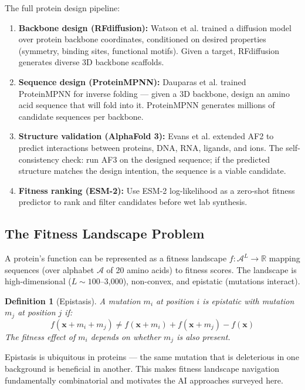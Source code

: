 \documentclass[11pt]{article}
\newtheorem{definition}{Definition}
\begin{document}
The full protein design pipeline:

\begin{enumerate}
\item \textbf{Backbone design (RFdiffusion):} Watson et al. \citep{watson2023novo} trained a diffusion model over protein backbone coordinates, conditioned on desired properties (symmetry, binding sites, functional motifs). Given a target, RFdiffusion generates diverse 3D backbone scaffolds.

\item \textbf{Sequence design (ProteinMPNN):} Dauparas et al. \citep{dauparas2022robust} trained ProteinMPNN for inverse folding --- given a 3D backbone, design an amino acid sequence that will fold into it. ProteinMPNN generates millions of candidate sequences per backbone.

\item \textbf{Structure validation (AlphaFold 3):} Evans et al. \citep{evans2024alphafold3} extended AF2 to predict interactions between proteins, DNA, RNA, ligands, and ions. The self-consistency check: run AF3 on the designed sequence; if the predicted structure matches the design intention, the sequence is a viable candidate.

\item \textbf{Fitness ranking (ESM-2):} Use ESM-2 log-likelihood as a zero-shot fitness predictor to rank and filter candidates before wet lab synthesis.
\end{enumerate}

\subsection{The Fitness Landscape Problem}

A protein's function can be represented as a fitness landscape $f: \mathcal{A}^L \rightarrow \mathbb{R}$ mapping sequences (over alphabet $\mathcal{A}$ of 20 amino acids) to fitness scores. The landscape is high-dimensional ($L \sim 100$--3,000), non-convex, and epistatic (mutations interact).

\begin{definition}[Epistasis]
A mutation $m_i$ at position $i$ is epistatic with mutation $m_j$ at position $j$ if:
$$f(\mathbf{x} + m_i + m_j) \neq f(\mathbf{x} + m_i) + f(\mathbf{x} + m_j) - f(\mathbf{x})$$
The fitness effect of $m_i$ depends on whether $m_j$ is also present.
\end{definition}

Epistasis is ubiquitous in proteins --- the same mutation that is deleterious in one background is beneficial in another. This makes fitness landscape navigation fundamentally combinatorial and motivates the AI approaches surveyed here.
\end{document}
